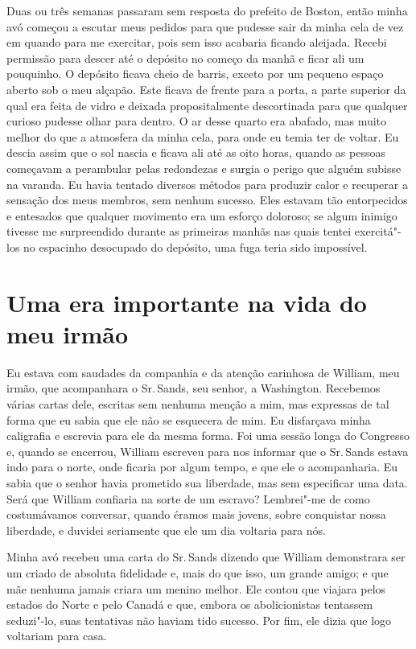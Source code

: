 Duas ou três semanas passaram sem
resposta do prefeito de Boston, então minha avó começou a escutar meus
pedidos para que pudesse sair da minha cela de vez em quando para me
exercitar, pois sem isso acabaria ficando aleijada. Recebi permissão
para descer até o depósito no começo da manhã e ficar ali um pouquinho.
O depósito ficava cheio de barris, exceto por um pequeno espaço aberto
sob o meu alçapão. Este ficava de frente para a porta, a parte superior
da qual era feita de vidro e deixada propositalmente descortinada para
que qualquer curioso pudesse olhar para dentro. O ar desse quarto era
abafado, mas muito melhor do que a atmosfera da minha cela, para onde eu
temia ter de voltar. Eu descia assim que o sol nascia e ficava ali até
as oito horas, quando as pessoas começavam a perambular pelas redondezas
e surgia o perigo que alguém subisse na varanda. Eu havia tentado
diversos métodos para produzir calor e recuperar a sensação dos meus
membros, sem nenhum sucesso. Eles estavam tão entorpecidos e entesados
que qualquer movimento era um esforço doloroso; se algum inimigo tivesse
me surpreendido durante as primeiras manhãs nas quais tentei
exercitá"-los no espacinho desocupado do depósito, uma fuga teria sido
impossível.

\chapter*{Uma era importante na vida do meu irmão}

Eu estava com saudades da companhia e
da atenção carinhosa de William, meu irmão, que acompanhara o Sr.\,Sands,
seu senhor, a Washington. Recebemos várias cartas dele, escritas sem
nenhuma menção a mim, mas expressas de tal forma que eu sabia que ele
não se esquecera de mim. Eu disfarçava minha caligrafia e escrevia para
ele da mesma forma. Foi uma sessão longa do Congresso e, quando se
encerrou, William escreveu para nos informar que o Sr.\,Sands estava indo
para o norte, onde ficaria por algum tempo, e que ele o acompanharia. Eu
sabia que o senhor havia prometido sua liberdade, mas sem especificar
uma data. Será que William confiaria na sorte de um escravo? Lembrei"-me
de como costumávamos conversar, quando éramos mais jovens, sobre
conquistar nossa liberdade, e duvidei seriamente que ele um dia voltaria
para nós.

Minha avó recebeu uma carta do Sr.\,Sands dizendo que William demonstrara ser um criado de absoluta
fidelidade e, mais do que isso, um grande amigo; e que mãe nenhuma
jamais criara um menino melhor. Ele contou que viajara pelos estados do
Norte e pelo Canadá e que, embora os abolicionistas tentassem seduzi"-lo,
suas tentativas não haviam tido sucesso. Por fim, ele dizia que logo
voltariam para casa.

